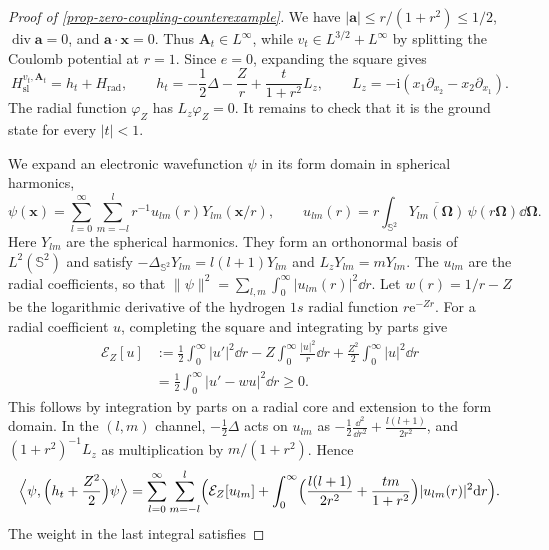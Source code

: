 \documentclass[final,reqno]{amsart}
\DeclareMathOperator{\div}{div}
\theoremstyle{remark}
\renewcommand{\i}{\mathrm{i}}
\newcommand{\e}{\mathrm{e}}
\newcommand{\ol}[1]{\overline{#1}}
\newcommand{\rad}{\mathrm{rad}}
\let\phi=\varphi
\newcommand{\vOmega}{{\bm{\Omega}}}
\renewcommand{\va}{\mathbf{a}}
\newcommand{\vx}{\mathbf{x}}
\newcommand{\vA}{{\mathbf{A}}}
\begin{document}
\begin{proof}[Proof of \cref{prop-zero-coupling-counterexample}]
We have $|\va|\leq r/(1+r^2)\leq1/2$,
$\div\va=0$, and $\va\cdot\vx=0$.  Thus $\vA_t\in L^\infty$,
while $v_t\in L^{3/2}+L^\infty$ by splitting the Coulomb potential
at $r=1$.  Since $e=0$, expanding the square gives
\begin{equation*}
 H_{\mathrm{sl}}^{v_t,\vA_t}=h_t+H_\rad,\qquad
 h_t=-\frac12\Delta-\frac Zr+\frac{t}{1+r^2}L_z,
 \qquad L_z=-\i(x_1\partial_{x_2}-x_2\partial_{x_1}).
\end{equation*}
The radial function $\phi_Z$ has $L_z\phi_Z=0$.  It remains to check
that it is the ground state for every $|t|<1$.

We expand an electronic wavefunction $\psi$ in its form domain in
spherical harmonics,
\[
 \psi(\vx)=\sum_{l=0}^\infty\sum_{m=-l}^l
                  r^{-1}u_{lm}(r)Y_{lm}(\vx/r),\qquad
 u_{lm}(r)=r\int_{\mathbb S^2}\ol{Y_{lm}(\vOmega)}\,\psi(r\vOmega)\dd\vOmega.
\]
Here $Y_{lm}$ are the spherical harmonics.  They form an orthonormal
basis of $L^2(\mathbb S^2)$ and satisfy
$-\Delta_{\mathbb S^2}Y_{lm}=l(l+1)Y_{lm}$ and $L_zY_{lm}=mY_{lm}$.
The $u_{lm}$ are the radial coefficients, so that $\|\psi\|^2=\sum_{l,m}\int_0^\infty|u_{lm}(r)|^2\dd r$.
Let $w(r)=1/r-Z$ be the logarithmic derivative of the hydrogen $1s$
radial function $r\e^{-Zr}$.  For a radial coefficient $u$, completing
the square and integrating by parts give
\begin{equation}\label{radial-factorization}
 \begin{split}
 \mathcal E_Z[u]
 &:=\frac12\int_0^\infty|u'|^2\dd r
       -Z\int_0^\infty\frac{|u|^2}{r}\dd r
       +\frac{Z^2}{2}\int_0^\infty|u|^2\dd r\\
 &=\frac12\int_0^\infty
             |u'-wu|^2\dd r
 \geq0.
 \end{split}
\end{equation}
This follows by integration by parts on a radial core and extension
to the form domain.  In the $(l,m)$ channel, $-\frac12\Delta$ acts on
$u_{lm}$ as $-\frac12\frac{\dd^2}{\dd r^2}+\frac{l(l+1)}{2r^2}$, and
$(1+r^2)^{-1}L_z$ as multiplication by $m/(1+r^2)$.  Hence
\begin{equation}\label{channel-decomposition}
 \Bigl\langle\psi,\Bigl(h_t+\frac{Z^2}{2}\Bigr)\psi\Bigr\rangle
 =\sum_{l=0}^\infty\sum_{m=-l}^l\Bigl(\mathcal E_Z[u_{lm}]
   +\int_0^\infty\Bigl(\frac{l(l+1)}{2r^2}+\frac{tm}{1+r^2}\Bigr)
     |u_{lm}(r)|^2\dd r\Bigr).
\end{equation}
The weight in the last integral satisfies

\end{proof}
\end{document}
